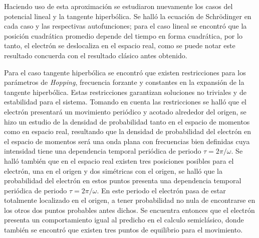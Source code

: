  Haciendo uso de esta aproximación se estudiaron nuevamente los casos del potencial lineal y la tangente hiperbólica. Se halló la ecuación de Schrödinger en cada caso y las respectivas autofunciones; para el caso lineal se encontró que la posición cuadrática promedio depende del tiempo en forma cuadrática, por lo tanto, el electrón se deslocaliza en el espacio real, como se puede notar este resultado concuerda con el resultado clásico antes obtenido.
 
 Para el caso tangente hiperbólica se encontró que existen restricciones para los parámetros de \textit{Hopping}, frecuencia forzante y constantes en la expansión de la tangente hiperbólica. Estas restricciones garantizan soluciones no triviales y de estabilidad para el sistema. Tomando en cuenta las restricciones se halló que el electrón presentará un movimiento periódico y acotado alrededor del origen, se hizo un estudio de la densidad de probabilidad tanto en el espacio de momentos como en espacio real, resultando que la densidad de probabilidad del electrón en el espacio de momentos será una onda plana con frecuencias bien definidas cuya intensidad tiene una dependencia temporal periódica de periodo $\tau=2\pi/\omega$. Se halló también que en el espacio real existen tres posiciones posibles para el electrón, una en el origen y dos simétricas con el origen, se halló que la probabilidad del electrón en estos puntos presenta una dependencia temporal periódica de periodo $\tau=2\pi/ \omega$. En este periodo el electrón pasa de estar totalmente localizado en el origen, a tener probabilidad no nula de encontrarse en los otros dos puntos probables antes dichos. Se encuentra entonces que el electrón presenta un comportamiento igual al predicho en el calculo semiclásico, donde también se encontró que existen tres puntos de equilibrio para el movimiento.
 
